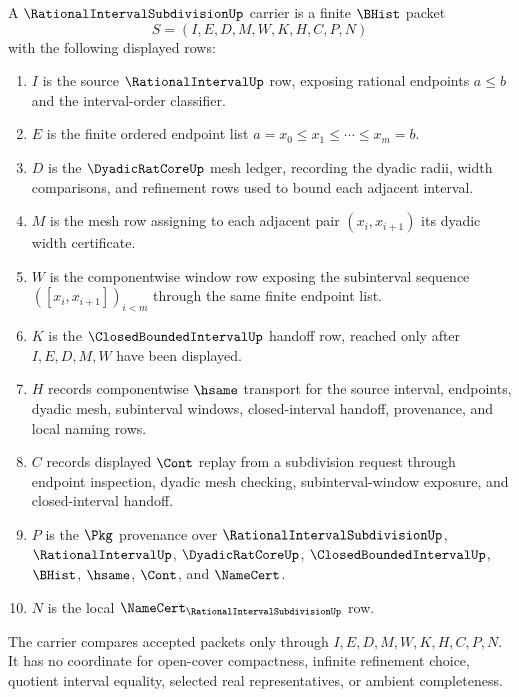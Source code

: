 \begin{definition}
\label{def:rational-interval-subdivision-carrier}
A $\RationalIntervalSubdivisionUp$ carrier is a finite $\BHist$ packet
$$
S=(I,E,D,M,W,K,H,C,P,N)
$$
with the following displayed rows:
\begin{enumerate}
\item $I$ is the source $\RationalIntervalUp$ row, exposing rational endpoints $a\leq b$ and the interval-order classifier.
\item $E$ is the finite ordered endpoint list $a=x_0\leq x_1\leq \cdots \leq x_m=b$.
\item $D$ is the $\DyadicRatCoreUp$ mesh ledger, recording the dyadic radii, width comparisons, and refinement rows used to bound each adjacent interval.
\item $M$ is the mesh row assigning to each adjacent pair $(x_i,x_{i+1})$ its dyadic width certificate.
\item $W$ is the componentwise window row exposing the subinterval sequence $( [x_i,x_{i+1}] )_{i<m}$ through the same finite endpoint list.
\item $K$ is the $\ClosedBoundedIntervalUp$ handoff row, reached only after $I,E,D,M,W$ have been displayed.
\item $H$ records componentwise $\hsame$ transport for the source interval, endpoints, dyadic mesh, subinterval windows, closed-interval handoff, provenance, and local naming rows.
\item $C$ records displayed $\Cont$ replay from a subdivision request through endpoint inspection, dyadic mesh checking, subinterval-window exposure, and closed-interval handoff.
\item $P$ is the $\Pkg$ provenance over $\RationalIntervalSubdivisionUp$, $\RationalIntervalUp$, $\DyadicRatCoreUp$, $\ClosedBoundedIntervalUp$, $\BHist$, $\hsame$, $\Cont$, and $\NameCert$.
\item $N$ is the local $\NameCert_{\RationalIntervalSubdivisionUp}$ row.
\end{enumerate}
The carrier compares accepted packets only through $I,E,D,M,W,K,H,C,P,N$. It has no coordinate for open-cover compactness, infinite refinement choice, quotient interval equality, selected real representatives, or ambient completeness.
\end{definition}

